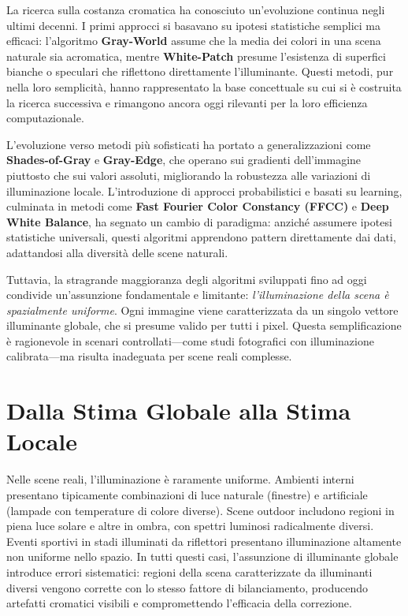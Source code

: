 La ricerca sulla costanza cromatica ha conosciuto un'evoluzione continua negli ultimi decenni. I primi approcci si basavano su ipotesi statistiche semplici ma efficaci: l'algoritmo \textbf{Gray-World} assume che la media dei colori in una scena naturale sia acromatica, mentre \textbf{White-Patch} presume l'esistenza di superfici bianche o speculari che riflettono direttamente l'illuminante. Questi metodi, pur nella loro semplicità, hanno rappresentato la base concettuale su cui si è costruita la ricerca successiva e rimangono ancora oggi rilevanti per la loro efficienza computazionale.

L'evoluzione verso metodi più sofisticati ha portato a generalizzazioni come \textbf{Shades-of-Gray} e \textbf{Gray-Edge}, che operano sui gradienti dell'immagine piuttosto che sui valori assoluti, migliorando la robustezza alle variazioni di illuminazione locale. L'introduzione di approcci probabilistici e basati su learning, culminata in metodi come \textbf{Fast Fourier Color Constancy (FFCC)} e \textbf{Deep White Balance}, ha segnato un cambio di paradigma: anziché assumere ipotesi statistiche universali, questi algoritmi apprendono pattern direttamente dai dati, adattandosi alla diversità delle scene naturali.

Tuttavia, la stragrande maggioranza degli algoritmi sviluppati fino ad oggi condivide un'assunzione fondamentale e limitante: \emph{l'illuminazione della scena è spazialmente uniforme}. Ogni immagine viene caratterizzata da un singolo vettore illuminante globale, che si presume valido per tutti i pixel. Questa semplificazione è ragionevole in scenari controllati---come studi fotografici con illuminazione calibrata---ma risulta inadeguata per scene reali complesse.

\section{Dalla Stima Globale alla Stima Locale}

Nelle scene reali, l'illuminazione è raramente uniforme. Ambienti interni presentano tipicamente combinazioni di luce naturale (finestre) e artificiale (lampade con temperature di colore diverse). Scene outdoor includono regioni in piena luce solare e altre in ombra, con spettri luminosi radicalmente diversi. Eventi sportivi in stadi illuminati da riflettori presentano illuminazione altamente non uniforme nello spazio. In tutti questi casi, l'assunzione di illuminante globale introduce errori sistematici: regioni della scena caratterizzate da illuminanti diversi vengono corrette con lo stesso fattore di bilanciamento, producendo artefatti cromatici visibili e compromettendo l'efficacia della correzione.

